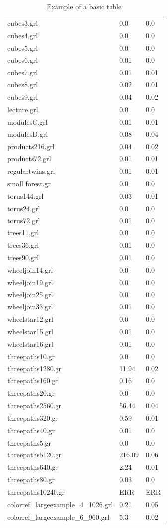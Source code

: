 \documentclass[11pt]{article}
\begin{document}
\begin{table}[h!]
\begin{tabularx}{\textwidth}{|l|X|X|}
		cubes3.grl & 0.0 & 0.0 \\
		cubes4.grl & 0.0 & 0.0 \\
		cubes5.grl & 0.0 & 0.0 \\
		cubes6.grl & 0.01 & 0.0 \\
		cubes7.grl & 0.01 & 0.01 \\
		cubes8.grl & 0.02 & 0.01 \\
		cubes9.grl & 0.04 & 0.02 \\
		lecture.grl & 0.0 & 0.0 \\
		modulesC.grl & 0.01 & 0.01 \\
		modulesD.grl & 0.08 & 0.04 \\
		products216.grl & 0.04 & 0.02 \\
		products72.grl & 0.01 & 0.01 \\
		regulartwins.grl & 0.01 & 0.01 \\
		small forest.gr & 0.0 & 0.0 \\
		torus144.grl & 0.03 & 0.01 \\
		torus24.grl & 0.0 & 0.0 \\
		torus72.grl & 0.01 & 0.0 \\
		trees11.grl & 0.0 & 0.0 \\
		trees36.grl & 0.01 & 0.0 \\
		trees90.grl & 0.01 & 0.0 \\
		wheeljoin14.grl & 0.0 & 0.0 \\
		wheeljoin19.grl & 0.0 & 0.0 \\
		wheeljoin25.grl & 0.0 & 0.0 \\
		wheeljoin33.grl & 0.01 & 0.0 \\
		wheelstar12.grl & 0.0 & 0.0 \\
		wheelstar15.grl & 0.01 & 0.0 \\
		wheelstar16.grl & 0.01 & 0.0 \\
		threepaths10.gr & 0.0 & 0.0 \\
		threepaths1280.gr & 11.94 & 0.02 \\
		threepaths160.gr & 0.16 & 0.0 \\
		threepaths20.gr & 0.0 & 0.0 \\
		threepaths2560.gr & 56.44 & 0.04 \\
		threepaths320.gr & 0.59 & 0.01 \\
		threepaths40.gr & 0.01 & 0.0 \\
		threepaths5.gr & 0.0 & 0.0 \\
		threepaths5120.gr & 216.09 & 0.06 \\
		threepaths640.gr & 2.24 & 0.01 \\
		threepaths80.gr & 0.03 & 0.0 \\
		threepaths10240.gr & ERR & ERR \\
		colorref\_largeexample\_4\_1026.grl & 0.21 & 0.05 \\
		colorref\_largeexample\_6\_960.grl & 5.3 & 0.02 \\
        \hline
    \end{tabularx}
    \caption{Example of a basic table}
    \label{tab:1}
\end{table}
\end{document}
